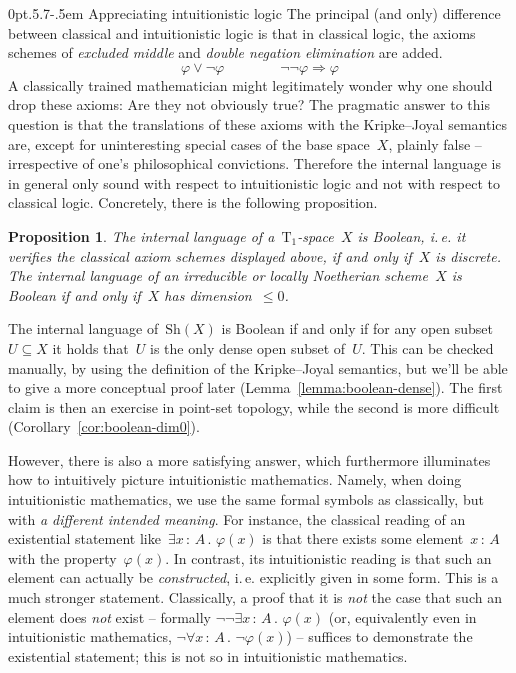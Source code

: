 \documentclass[10pt,reqno,a4paper]{amsbook}
\makeatletter
\theoremstyle{definition}
\theoremstyle{plain}
\newtheorem{prop}[defn]{Proposition}
\theoremstyle{remark}
\newcommand{\Sh}{\mathrm{Sh}}
\newcommand{\?}{\,{:}\,}
\renewcommand{\_}{\mathpunct{.}\,}
\newcommand{\ie}{i.\,e.\@\xspace}
\renewenvironment{proof}[1][\proofname]{\par
  \pushQED{\qed}%
  \normalfont \topsep6\p@\@plus6\p@\relax
  \trivlist
  \item[\hskip\labelsep
        \itshape
    #1\@addpunct{.}]\ignorespaces
}{%
  \popQED\endtrivlist\@endpefalse
}
\def\subsection{\@startsection{subsection}{2}%
  {0pt}{.5\linespacing\@plus.7\linespacing}{-.5em}%
  {\normalfont\bfseries}}
\makeatother
\begin{document}
\subsection{Appreciating intuitionistic logic}
\label{sect:appreciating-intuitionistic-logic}
The principal (and only) difference between classical and intuitionistic logic
is that in classical logic, the axioms schemes of \emph{excluded middle} and
\emph{double negation elimination} are added.
\[ \varphi \vee \neg\varphi \qquad\qquad \neg\neg\varphi \Rightarrow \varphi \]
A classically trained mathematician might legitimately wonder why one should
drop these axioms: Are they not obviously true? The pragmatic answer to this
question is that the translations of these axioms with the Kripke--Joyal
semantics are, except for uninteresting special cases of the base space~$X$,
plainly false -- irrespective of one's philosophical convictions. Therefore the
internal language is in general only sound with respect to intuitionistic logic and
not with respect to classical logic. Concretely, there is the following
proposition.
\begin{prop}The internal language of
a~$\mathrm{T}_1$-space~$X$ is \emph{Boolean}, \ie it verifies the classical
axiom schemes displayed above, if and only if~$X$ is discrete.
The internal language of an irreducible or locally Noetherian scheme~$X$ is Boolean if and only if~$X$ has
dimension~$\leq 0$.
\end{prop}
\begin{proof}\label{prop:lang-boolean}
The internal language of~$\Sh(X)$ is Boolean if and only if for
any open subset~$U \subseteq X$ it holds that~$U$ is the only dense open subset
of~$U$. This can be checked manually, by using the definition of the
Kripke--Joyal semantics, but we'll be able to give a more conceptual proof
later (Lemma~\ref{lemma:boolean-dense}). The first claim is then an exercise in
point-set topology, while the second is more difficult
(Corollary~\ref{cor:boolean-dim0}).
\end{proof}

However, there is also a more satisfying answer, which furthermore
illuminates how to intuitively picture intuitionistic mathematics.
Namely, when doing intuitionistic mathematics, we use the same formal symbols as classically, but with
\emph{a different intended meaning}. For instance, the classical reading of an
existential statement like~$\exists x\?A\_ \varphi(x)$ is that there exists
some element~$x \? A$ with the property~$\varphi(x)$. In contrast, its
intuitionistic reading is that such an element can actually be
\emph{constructed}, \ie explicitly given in some form. This is a much stronger
statement. Classically, a proof that it is \emph{not} the case that such an
element does \emph{not} exist -- formally $\neg\neg \exists x\?A\_ \varphi(x)$
(or, equivalently even in intuitionistic mathematics, $\neg\forall x\? A\_
\neg\varphi(x)$) -- suffices to demonstrate the existential statement; this is not
so in intuitionistic mathematics.
\end{document}
